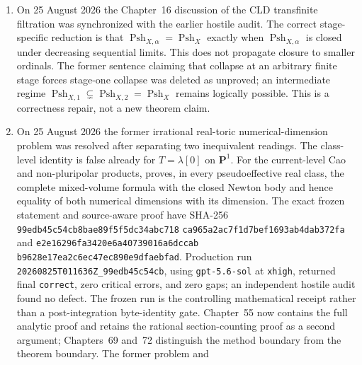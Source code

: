 \begin{enumerate}
  two Chapter~55 statements.  The resulting
  theorem is restricted to connected smooth projective complex varieties,
  big line bundles, and singular psh metrics of positive Cao, equivalently
  ideal-model, volume; the line-bundle formula is its minimal-singularity
  specialization.  The author-supplied manuscript remains unpublished, and
  zero volume, transcendental classes, singular varieties, and attainment of
  the valuation supremum remain outside the result.
\item On 25 August 2026 the Chapter~16 discussion of the CLD transfinite
  filtration was synchronized with the earlier hostile audit.  The correct
  stage-specific reduction is that
  \(\operatorname{Psh}_{X,\alpha}=\operatorname{Psh}_X\) exactly when
  \(\operatorname{Psh}_{X,\alpha}\) is closed under decreasing sequential
  limits.  This does not propagate closure to smaller ordinals.  The former
  sentence claiming that collapse at an arbitrary finite stage forces
  stage-one collapse was deleted as unproved; an intermediate regime
  \(\operatorname{Psh}_{X,1}\subsetneq
    \operatorname{Psh}_{X,2}=\operatorname{Psh}_X\)
  remains logically possible.  This is a correctness repair, not a new
  theorem claim.
\item On 25 August 2026 the former irrational real-toric numerical-dimension
  problem was resolved after separating two inequivalent readings.  The
  class-level identity is false already for
  \(T=\lambda[0]\) on \(\mathbf P^1\).  For the current-level Cao and
  non-pluripolar products,  proves, in every
  pseudoeffective real class, the complete mixed-volume formula with the
  closed Newton body and hence equality of both numerical dimensions with
  its dimension.  The exact frozen statement and source-aware proof have
  SHA-256
  \texttt{99edb45c54cb8bae89f5f5dc34abc718}
  \allowbreak\texttt{ca965a2ac7f1d7bef1693ab4dab372fa} and
  \texttt{e2e16296fa3420e6a40739016a6dccab}
  \allowbreak\texttt{b9628e17ea2c6ec47ec890e9dfaebfad}.
  Production run
  \texttt{20260825T011636Z\_99edb45c54cb}, using
  \texttt{gpt-5.6-sol} at \texttt{xhigh}, returned final
  \texttt{correct}, zero critical errors, and zero gaps; an independent
  hostile audit found no defect.  The frozen run is the controlling
  mathematical receipt rather than a post-integration byte-identity gate.
  Chapter~55 now contains the full analytic proof and retains the rational
  section-counting proof as a second argument; Chapters~69 and~72 distinguish
  the method boundary from the theorem boundary.  The former problem and

\end{enumerate}
